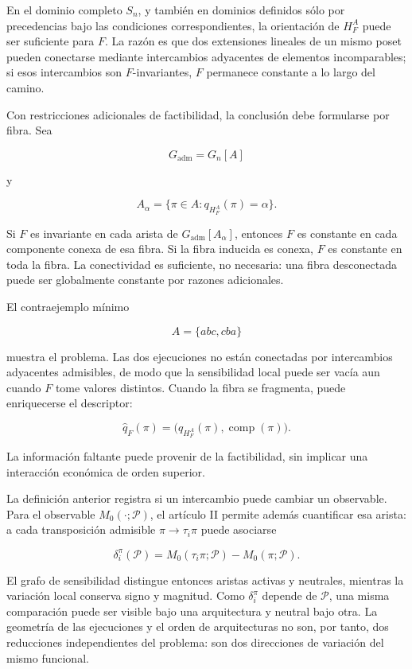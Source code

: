 \documentclass[10pt,a5paper,twoside]{article}
\begin{document}
En el dominio completo \(S_n\), y también en dominios definidos sólo por
precedencias bajo las condiciones correspondientes, la orientación de
\(H_F^A\) puede ser suficiente para \(F\). La razón es que dos
extensiones lineales de un mismo poset pueden conectarse mediante
intercambios adyacentes de elementos incomparables; si esos intercambios
son \(F\)-invariantes, \(F\) permanece constante a lo largo del camino.

Con restricciones adicionales de factibilidad, la conclusión debe
formularse por fibra. Sea

\[
G_{\mathrm{adm}}
=
G_n[A]
\]

y

\[
A_\alpha
=
\{\pi\in A:q_{H_F^A}(\pi)=\alpha\}.
\]

Si \(F\) es invariante en cada arista de \(G_{\mathrm{adm}}[A_\alpha]\),
entonces \(F\) es constante en cada componente conexa de esa fibra. Si
la fibra inducida es conexa, \(F\) es constante en toda la fibra. La
conectividad es suficiente, no necesaria: una fibra desconectada puede
ser globalmente constante por razones adicionales.

El contraejemplo mínimo

\[
A=\{abc,cba\}
\]

muestra el problema. Las dos ejecuciones no están conectadas por
intercambios adyacentes admisibles, de modo que la sensibilidad local
puede ser vacía aun cuando \(F\) tome valores distintos. Cuando la fibra
se fragmenta, puede enriquecerse el descriptor:

\[
\widehat q_F(\pi)
=
\bigl(
q_{H_F^A}(\pi),
\operatorname{comp}(\pi)
\bigr).
\]

La información faltante puede provenir de la factibilidad, sin implicar una
interacción económica de orden superior.

La definición anterior registra si un intercambio puede cambiar un
observable. Para el observable \(M_0(\cdot;\mathcal P)\), el artículo II
permite además cuantificar esa arista: a cada transposición admisible
\(\pi\to\tau_i\pi\) puede asociarse

\[
\delta_i^\pi(\mathcal P)
=
M_0(\tau_i\pi;\mathcal P)-M_0(\pi;\mathcal P).
\]

El grafo de sensibilidad distingue entonces aristas activas y neutrales,
mientras la variación local conserva signo y magnitud. Como
\(\delta_i^\pi\) depende de \(\mathcal P\), una misma comparación puede
ser visible bajo una arquitectura y neutral bajo otra. La geometría de
las ejecuciones y el orden de arquitecturas no son, por tanto, dos
reducciones independientes del problema: son dos direcciones de
variación del mismo funcional.
\end{document}
